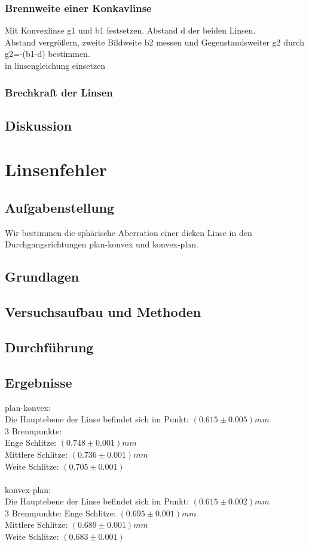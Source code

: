\documentclass{article}
\begin{document}
\subsubsection*{Brennweite einer Konkavlinse}
Mit Konvexlinse g1 und b1 festsetzen. Abstand d der beiden Linsen. \\
Abstand vergrößern, zweite Bildweite b2 messen und Gegenstandsweiter g2 durch g2=-(b1-d) bestimmen.\\
in linsengleichung einsetzen

\subsubsection*{Brechkraft der Linsen}
\subsection{Diskussion}

\section{Linsenfehler}

\subsection{Aufgabenstellung}
Wir bestimmen die sphärische Aberration einer dicken Linse in den Durchgangsrichtungen plan-konvex und konvex-plan.
\subsection{Grundlagen}
\subsection{Versuchsaufbau und Methoden}
\subsection{Durchführung}
\subsection{Ergebnisse}
plan-konvex:\\
Die Hauptebene der Linse befindet sich im Punkt: $(0.615 \pm 0.005)mm$\\
3 Brennpunkte:\\
Enge Schlitze: $(0.748 \pm 0.001)mm$\\
Mittlere Schlitze: $(0.736 \pm 0.001)mm$\\
Weite Schlitze: $(0.705 \pm 0.001)$\\
\\
konvex-plan:\\
Die Hauptebene der Linse befindet sich im Punkt: $(0.615 \pm 0.002)mm$\\
3 Brennpunkte:
Enge Schlitze: $(0.695 \pm 0.001)mm$\\
Mittlere Schlitze: $(0.689 \pm 0.001)mm$\\
Weite Schlitze: $(0.683 \pm 0.001)$\\
\end{document}
